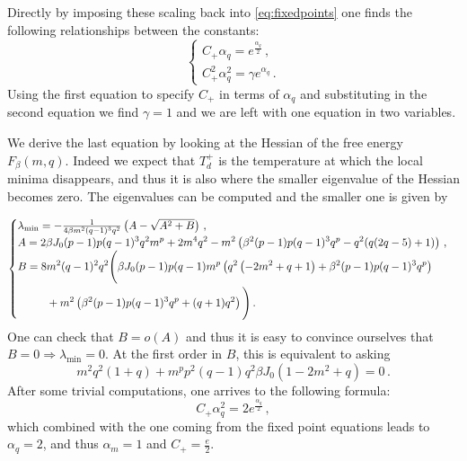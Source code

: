 \documentclass[]{article}
\theoremstyle{plain}%
\theoremstyle{definition}%
\theoremstyle{remark}%
\begin{document}
Directly by imposing these scaling back into \eqref{eq:fixedpoints} one finds the following relationships between the constants:
\begin{equation}\label{eq:Cplusalpha}
    \begin{cases}
        C_+\alpha_q = e^{\frac{\alpha_q}{2}}\,, \\
        C_+^2\alpha_q^2 = \gamma e^{\alpha_q}\,.
    \end{cases}
\end{equation}
Using the first equation to specify $C_+$ in terms of $\alpha_q$ and substituting in the second equation we find $\gamma = 1$ and we are left with one equation in two variables.

We derive the last equation by looking at the Hessian of the free energy $F_{\beta}(m,q)$. Indeed we expect that $T_d^+$ is the temperature at which the local minima disappears, and thus it is also where the smaller eigenvalue of the Hessian becomes zero. 
The eigenvalues can be computed and the smaller one is given by

\begin{equation}
    \begin{cases}
        \lambda_{\rm min} = -\frac{1}{4 \beta  m^2 (q-1)^3 q^2}\left(A - \sqrt{A^2 + B}\right)\,, \\
        \begin{aligned}
        A = 2 \beta  J_0 (p-1) p (q-1)^3 q^2 m^p+2 m^4 q^2 -m^2 \left(\beta ^2 (p-1) p (q-1)^3 q^p- q^2 (q (2 q-5)+1)\right) \,, 
        \end{aligned}\\
        \begin{aligned}
        B = 8&m^2 (q-1)^2 q^2 \Bigg(\beta  J_0 (p-1) p (q-1) m^p \left( q^2 \left(-2 m^2+q+1\right)+\beta ^2 (p-1) p (q-1)^3
   q^p\right)\\ &+m^2 \left(\beta ^2 (p-1) p (q-1)^3 q^p+ (q+1) q^2\right)\Bigg)\,.
        \end{aligned}
    \end{cases}
\end{equation}
One can check that $B = o(A)$ and thus it is easy to convince ourselves that $B = 0 \Rightarrow\lambda_{\min} = 0$. At the first order in $B$, this is equivalent to asking 
\begin{equation}
    m^2q^2(1+q) + m^pp^2(q-1)q^2\beta J_0(1-2m^2 + q) = 0 \,.
\end{equation}
After some trivial computations, one arrives to the following formula:
\begin{equation}
    C_+\alpha_q^2 = 2e^{\frac{\alpha_q}{2}} \,,
\end{equation}
which combined with the one coming from the fixed point equations leads to $\alpha_q = 2$, and thus $\alpha_m=1$ and $C_+ = \frac{e}{2}$.
\end{document}
